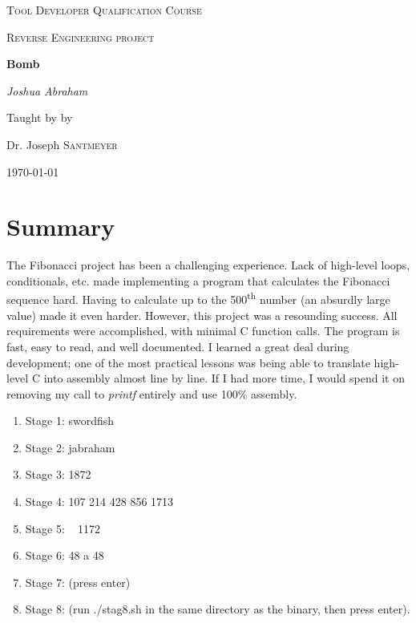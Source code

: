 \documentclass{article}
\begin{document}
\begin{titlepage}
	\centering
	{\scshape\LARGE Tool Developer Qualification Course\par}
	\vspace{1cm}
	{\scshape\Large Reverse Engineering project\par}
	\vspace{1.5cm}
	{\huge\bfseries Bomb\par}
	\vspace{2cm}
	{\Large\itshape Joshua Abraham\par}
	\vfill
	Taught by by\par
	Dr. Joseph \textsc{Santmeyer}
	\vfill
	{\large \today\par}
\end{titlepage}


\newpage
\tableofcontents
\newpage


\section{Summary}
\begin{flushleft}
\vspace{.5pc}
\end{flushleft}
\par
The Fibonacci project has been a challenging experience.  Lack of high-level
loops, conditionals, etc. made implementing a program that calculates the 
Fibonacci sequence hard. Having to calculate up to the 500\textsuperscript{th}
number (an absurdly large value) made it even harder.  However, this project 
was a resounding success.  All requirements were accomplished, with minimal
C function calls.  The program is fast, easy to read, and well documented.  I
learned a great deal during development; one of the most practical lessons was
being able to translate high-level C into assembly almost line by line.  If I 
had more time, I would spend it on removing my call to \textit{printf} 
entirely and use 100\% assembly.

\begin{enumerate}
  \item Stage 1: swordfish
  \item Stage 2: jabraham
  \item Stage 3: 1872
  \item Stage 4: 107 214 428 856 1713
  \item Stage 5: ~ 1172 ~
  \item Stage 6: 48 a 48
  \item Stage 7: (press enter)
  \item Stage 8: (run ./stag8.sh in the same directory as the binary, then 
  press enter).
\end{enumerate}
\end{document}
